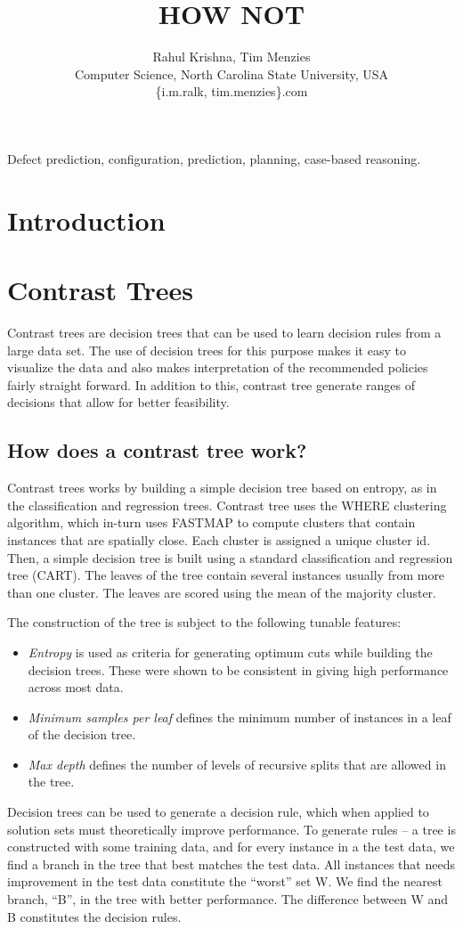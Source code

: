 \documentclass[conference]{IEEEtran}
\title{HOW NOT}
\author{Rahul Krishna, Tim Menzies\\
        Computer Science, North Carolina State University, USA\\
       \{i.m.ralk, tim.menzies\}\@gmail.com
       
}
\begin{document}
  \maketitle
    \begin{abstract}
 
  \end{abstract}
  \begin{IEEEkeywords}
Defect prediction, configuration, prediction, planning, case-based reasoning.
  \end{IEEEkeywords}

\section{Introduction} 
\section{Contrast Trees}
Contrast trees are decision trees that can be used to learn decision rules from a large data set. The use of decision trees for this purpose makes it easy to visualize the data and also makes interpretation of the recommended policies fairly straight forward. In addition to this, contrast tree generate ranges of decisions that allow for better feasibility.
\subsection{How does a contrast tree work?}
Contrast trees works by building a simple decision tree based on entropy, as in the classification and regression trees. Contrast tree uses the WHERE clustering algorithm, which in-turn uses FASTMAP \cite{} to compute clusters 
that contain instances that are spatially close. Each cluster is assigned a unique cluster id. Then, a simple decision tree is built using a standard classification and regression tree (CART). The leaves of the tree contain several instances usually from more than one cluster. The leaves are scored using the mean of the majority cluster. 

The construction of the tree is subject to the following tunable features:
\begin{itemize}
\item \textit{Entropy} is used as criteria for generating optimum cuts while building the decision trees. These were shown to be consistent in giving high performance across most data.
\item \textit{Minimum samples per leaf} defines the minimum number of instances in a leaf of the decision tree.
\item \textit{Max depth} defines the number of levels of recursive splits that are allowed in the tree.
\end{itemize}
Decision trees can be used to generate a decision rule, which when applied to solution sets must theoretically improve performance. To generate rules -- a tree is constructed with some training data, and for every instance in a the test data, we find a branch in the tree that best matches the test data. All instances that needs improvement in the test data constitute the ``worst'' set W. We find the nearest branch, ``B'', in the tree with better performance. The difference between W and B constitutes the decision rules.
\end{document}
